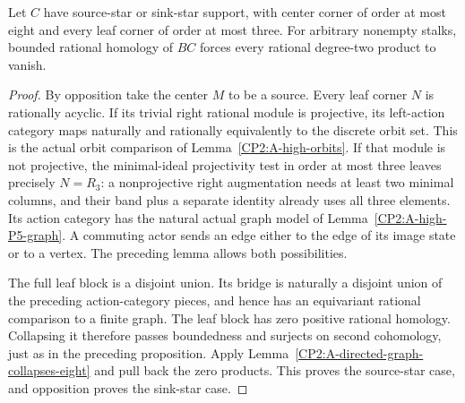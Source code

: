 \begin{proposition}
\label{CP2:A-star-eight-three-leaves}
Let $C$ have source-star or sink-star support, with center corner of
order at most eight and every leaf corner of order at most three.
For arbitrary nonempty stalks, bounded rational homology of $BC$
forces every rational degree-two product to vanish.
\end{proposition}
\begin{proof}
By opposition take the center $M$ to be a source.  Every leaf corner
$N$ is rationally acyclic.  If its trivial right rational module is
projective, its left-action category maps naturally and rationally
equivalently to the discrete orbit set.  This is the actual orbit
comparison of Lemma~\ref{CP2:A-high-orbits}.  If that module is not
projective, the minimal-ideal projectivity test in order at most three
leaves precisely $N=R_3$: a nonprojective right augmentation needs at
least two minimal columns, and their band plus a separate identity
already uses all three elements.  Its action category has the natural
actual graph model of Lemma~\ref{CP2:A-high-P5-graph}.  A commuting
actor sends an edge either to the edge of its image state or to a
vertex.  The preceding lemma allows both possibilities.

The full leaf block is a disjoint union.  Its bridge is naturally a
disjoint union of the preceding action-category pieces, and hence has
an equivariant rational comparison to a finite graph.  The leaf block
has zero positive rational homology.  Collapsing it therefore passes
boundedness and surjects on second cohomology, just as in the preceding
proposition.  Apply Lemma~\ref{CP2:A-directed-graph-collapses-eight}
and pull back the zero products.  This proves the source-star case,
and opposition proves the sink-star case.
\end{proof}

